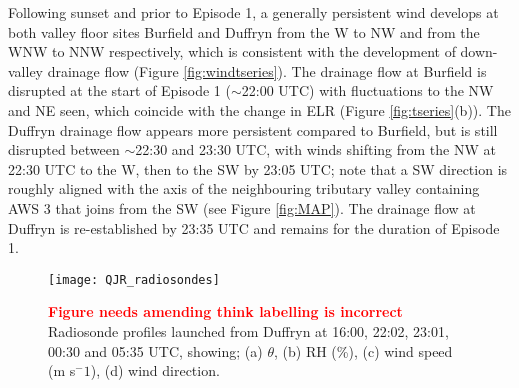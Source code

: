 \documentclass[times]{qjrms4}
\begin{document}
Following sunset and prior to Episode 1, a generally persistent wind develops at both valley floor sites Burfield and Duffryn from the W to NW and from the WNW to NNW respectively, which is consistent with the development of down-valley drainage flow (Figure \ref{fig:windtseries}). The drainage flow at Burfield is disrupted at the start of Episode 1 ($\sim$22:00 UTC) with fluctuations to the NW and NE seen, which coincide with the change in ELR (Figure \ref{fig:tseries}(b)). The Duffryn drainage flow appears more persistent compared to Burfield, but is still disrupted between $\sim$22:30 and 23:30 UTC, with winds shifting from the NW at 22:30 UTC to the W, then to the SW by 23:05 UTC; note that a SW direction is roughly aligned with the axis of the neighbouring tributary valley containing AWS 3 that joins from the SW (see Figure \ref{fig:MAP}). The drainage flow at Duffryn is re-established by 23:35 UTC and remains for the duration of Episode 1.
%
       \begin{figure*}
        \centering
        \texttt{[image: QJR\_radiosondes]}
        \caption{\textcolor{red}{\bf Figure needs amending think labelling is incorrect} Radiosonde profiles launched from Duffryn at 16:00, 22:02, 23:01, 00:30 and 05:35 UTC, showing; (a) $\theta$, (b) RH (\%), (c) wind speed (m s$^-1$), (d) wind direction.}
        \label{fig:radiosondes}
        \end{figure*}
\end{document}
